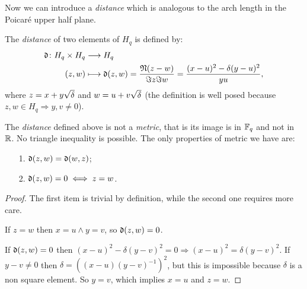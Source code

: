 Now we can introduce a {\it distance} which is analogous to the arch length in the Poicaré upper half plane.
\begin{defn}
	The {\it distance} of two elements of $H_q$ is defined by:
	\begin{align*}
	\operatorname{\mathfrak{d}} \colon H_q \times H_q & \longrightarrow H_q \\ (z,w) & \longmapsto \operatorname{\mathfrak{d}} (z,w)= \frac{\operatorname{\mathfrak{N}} (z-w)}{\Im z \Im w}= \frac{(x-u)^2-\delta (y-u)^2}{yu},
\end{align*}
where $z=x+y\sqrt{\delta}$ and $w=u+v\sqrt{\delta}$ (the definition is well posed because $z,w \in H_q \Rightarrow y,v \neq 0$).
\end{defn}
\begin{rem}
The {\it distance} defined above is not a {\it metric}, that is its image is in ${\mathbb F}_q$ and not in ${\mathbb R}$. No triangle inequality is possible. The only properties of metric we have are: 
\begin{itemize}
\item [1.] $\operatorname{\mathfrak{d}} (z,w)=\operatorname{\mathfrak{d}} (w,z)$;
\item [2.] $\operatorname{\mathfrak{d}} (z,w) =0 \iff z=w$.
\end{itemize}
\begin{proof}
The first item is trivial by definition, while the second one requires more care.

If $z=w$ then $x=u \land y=v$, so $\operatorname{\mathfrak{d}} (z,w) =0$.

If $\operatorname{\mathfrak{d}} (z,w) =0$ then $(x-u)^2-\delta (y-v)^2=0 \Rightarrow (x-u)^2 = \delta (y-v)^2$.
If $y-v\neq 0$ then $\delta = ((x-u)(y-v)^{-1})^2$, but this is impossible because $\delta$ is a non square element.
So $y=v$, which implies $x=u$ and $z=w$.
\end{proof}
\end{rem}

